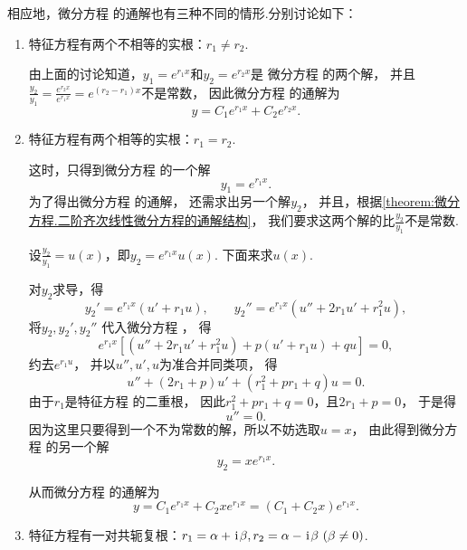相应地，微分方程  的通解也有三种不同的情形.分别讨论如下：\begin{enumerate}
\item 特征方程有两个不相等的实根：\(r_1 \neq r_2\).

由上面的讨论知道，\(y_1 = e^{r_1 x}\)和\(y_2 = e^{r_2 x}\)是
微分方程  的两个解，
并且\(\frac{y_2}{y_1} = \frac{e^{r_2 x}}{e^{r_1 x}} = e^{(r_2-r_1) x}\)不是常数，
因此微分方程  的通解为\[
	y = C_1 e^{r_1 x} + C_2 e^{r_2 x}.
\]

\item 特征方程有两个相等的实根：\(r_1 = r_2\).

这时，只得到微分方程  的一个解\[
	y_1 = e^{r_1 x}.
\]
为了得出微分方程  的通解，
还需求出另一个解\(y_2\)，
并且，根据\cref{theorem:微分方程.二阶齐次线性微分方程的通解结构}，
我们要求这两个解的比\(\frac{y_2}{y_1}\)不是常数.

设\(\frac{y_2}{y_1} = u(x)\)，即\(y_2 = e^{r_1 x} u(x)\).
下面来求\(u(x)\).

对\(y_2\)求导，得\[
	y_2' = e^{r_1 x} (u' + r_1 u),
	\qquad
	y_2'' = e^{r_1 x} (u'' + 2 r_1 u' + r_1^2 u),
\]
将\(y_2,y_2',y_2''\)
代入微分方程 ，
得\[
	e^{r_1 x} [(u'' + 2 r_1 u' + r_1^2 u) + p(u' + r_1 u) + qu] = 0,
\]
约去\(e^{r_1 u}\)，
并以\(u'',u',u\)为准合并同类项，
得\[
	u'' + (2 r_1 + p) u' + (r_1^2 + p r_1 + q) u = 0.
\]
由于\(r_1\)是特征方程  的二重根，
因此\(r_1^2 + p r_1 + q = 0\)，且\(2 r_1 + p = 0\)，
于是得\[
	u'' = 0.
\]
因为这里只要得到一个不为常数的解，所以不妨选取\(u = x\)，
由此得到微分方程  的另一个解\[
	y_2 = x e^{r_1 x}.
\]

从而微分方程  的通解为\[
	y = C_1 e^{r_1 x} + C_2 x e^{r_1 x}
	= (C_1 + C_2 x) e^{r_1 x}.
\]

\item 特征方程有一对共轭复根：\(r_1 = \alpha+\kern1pt\mathrm{i}\kern1pt\beta, r_2 = \alpha-\kern1pt\mathrm{i}\kern1pt\beta \ (\beta\neq0)\).


\end{enumerate}

